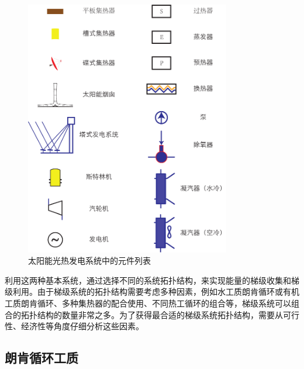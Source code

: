 \begin{figure}[!ht]
\centering
\includegraphics[width=0.8\textwidth]{fig/Legends.pdf}
\caption{太阳能光热发电系统中的元件列表}
\label{fig:Legends}
\end{figure}

利用这两种基本系统，通过选择不同的系统拓扑结构，来实现能量的梯级收集和梯级利用。由于梯级系统的拓扑结构需要考虑多种因素，例如水工质朗肯循环或有机工质朗肯循环、多种集热器的配合使用、不同热工循环的组合等，梯级系统可以组合的拓扑结构的数量非常之多。为了获得最合适的梯级系统拓扑结构，需要从可行性、经济性等角度仔细分析这些因素。

\subsection{朗肯循环工质}
\label{sec:RankineCycleFluid}

